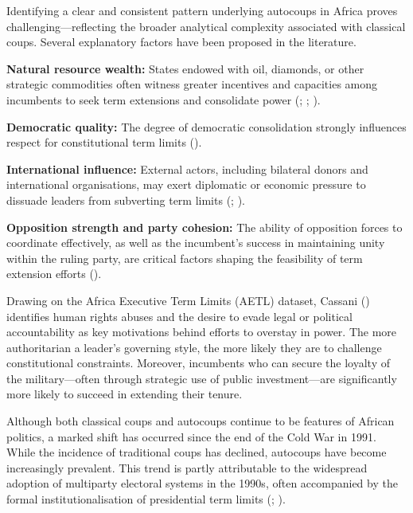 \documentclass[
  12pt,
]{report}
\begin{document}
Identifying a clear and consistent pattern underlying autocoups in
Africa proves challenging---reflecting the broader analytical complexity
associated with classical coups. Several explanatory factors have been
proposed in the literature.

\textbf{Natural resource wealth:} States endowed with oil, diamonds, or
other strategic commodities often witness greater incentives and
capacities among incumbents to seek term extensions and consolidate
power (;
;
).

\textbf{Democratic quality:} The degree of democratic consolidation
strongly influences respect for constitutional term limits
().

\textbf{International influence:} External actors, including bilateral
donors and international organisations, may exert diplomatic or economic
pressure to dissuade leaders from subverting term limits
(;
).

\textbf{Opposition strength and party cohesion:} The ability of
opposition forces to coordinate effectively, as well as the incumbent's
success in maintaining unity within the ruling party, are critical
factors shaping the feasibility of term extension efforts
().

Drawing on the Africa Executive Term Limits (AETL) dataset, Cassani
() identifies human rights abuses and
the desire to evade legal or political accountability as key motivations
behind efforts to overstay in power. The more authoritarian a leader's
governing style, the more likely they are to challenge constitutional
constraints. Moreover, incumbents who can secure the loyalty of the
military---often through strategic use of public investment---are
significantly more likely to succeed in extending their tenure.

Although both classical coups and autocoups continue to be features of
African politics, a marked shift has occurred since the end of the Cold
War in 1991. While the incidence of traditional coups has declined,
autocoups have become increasingly prevalent. This trend is partly
attributable to the widespread adoption of multiparty electoral systems
in the 1990s, often accompanied by the formal institutionalisation of
presidential term limits (;
).
\end{document}
